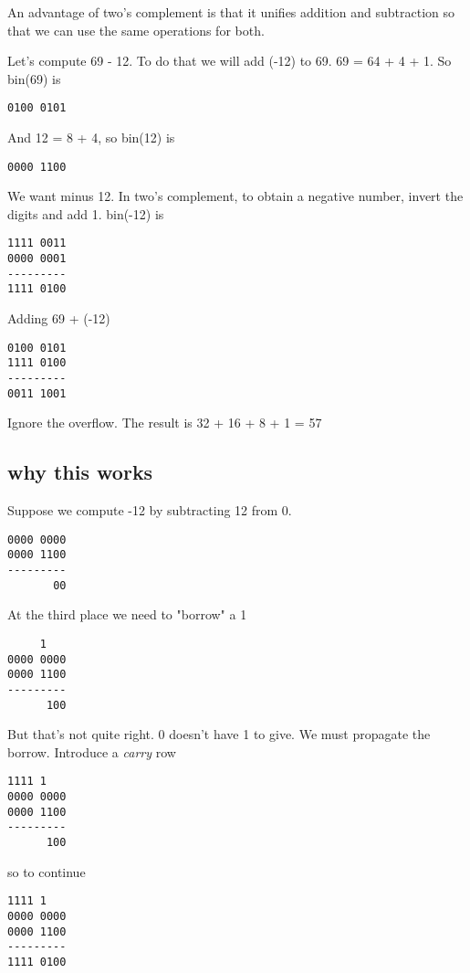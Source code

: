 \documentclass[11pt, oneside]{article}
\begin{document}
An advantage of two's complement is that it unifies addition and subtraction so that we can use the same operations for both.

Let's compute 69 - 12.  To do that we will add (-12) to 69.  69 = 64 + 4 + 1.  So bin(69) is
\begin{verbatim}
0100 0101
\end{verbatim}

And 12 = 8 + 4, so bin(12) is
\begin{verbatim}
0000 1100
\end{verbatim}

We want minus 12.  In two's complement, to obtain a negative number, invert the digits and add 1.  bin(-12) is

\begin{verbatim}
1111 0011
0000 0001
---------
1111 0100
\end{verbatim}

Adding 69 + (-12) 

\begin{verbatim}
0100 0101
1111 0100
---------
0011 1001
\end{verbatim}

Ignore the overflow.  The result is 32 + 16 + 8 + 1 = 57

\subsection*{why this works}

Suppose we compute -12 by subtracting 12 from 0.

\begin{verbatim}
0000 0000
0000 1100
---------
       00
\end{verbatim}

At the third place we need to "borrow" a 1

\begin{verbatim}
     1
0000 0000
0000 1100
---------
      100
\end{verbatim}


But that's not quite right.  0 doesn't have 1 to give.  We must propagate the borrow.  Introduce a \emph{carry} row

\begin{verbatim}
1111 1
0000 0000
0000 1100
---------
      100
\end{verbatim}

so to continue

\begin{verbatim}
1111 1
0000 0000
0000 1100
---------
1111 0100
\end{verbatim}
\end{document}
